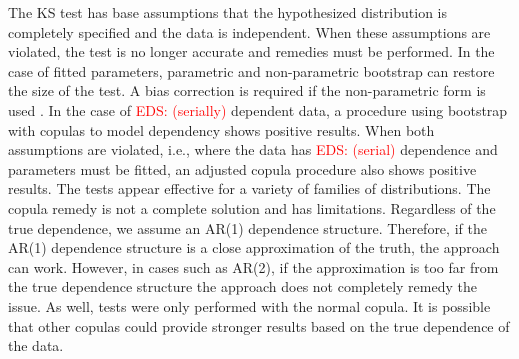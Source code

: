 \documentclass[12pt, letterpaper, titlepage]{article}
\newcommand{\eds}[1]{\textcolor{red}{EDS: (#1)}}
\begin{document}
The KS test has base assumptions that the hypothesized distribution is 
completely specified and the data is independent. When these assumptions are 
violated, the test is no longer accurate and remedies must be performed. In the 
case of fitted parameters, parametric and non-parametric bootstrap can restore 
the size of the test. A bias correction is required if the non-parametric form 
is used \citep{Babu}. In the case of \eds{serially} dependent data, a procedure 
using bootstrap 
with copulas to model dependency shows positive results. When both assumptions 
are violated, i.e., where the data has \eds{serial} dependence and parameters 
must 
be fitted, an adjusted copula procedure also shows positive results. The tests 
appear effective for a variety of families of distributions. The copula remedy 
is not a complete solution and has limitations. Regardless of the true 
dependence, we assume an AR(1) dependence structure. Therefore, if the AR(1) 
dependence structure is a close approximation of the truth, the approach can work. 
However, in cases such as AR(2), if the approximation is too far from the true 
dependence structure the approach does not completely remedy the issue. As well, 
tests were only performed with the normal copula. It is possible that other 
copulas could provide stronger results based on the true dependence of the data.



\end{document}
